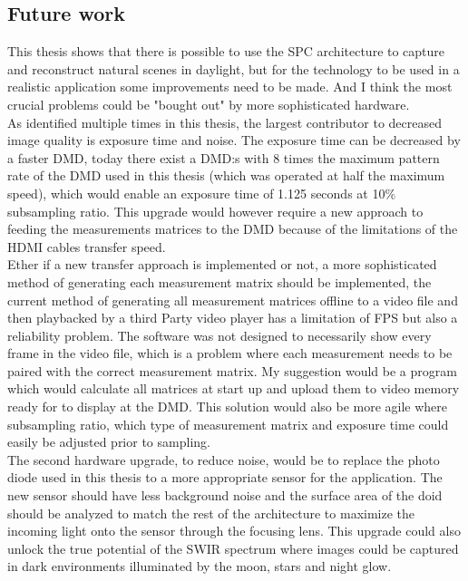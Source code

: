 \subsection{Future work}
This thesis shows that there is possible to use the SPC architecture to capture and reconstruct natural scenes in daylight, but for the technology to be used in a realistic application some improvements need to be made. And I think the most crucial problems could be "bought out" by more sophisticated hardware.\\[0.1in]

As identified multiple times in this thesis, the largest contributor to decreased image quality is exposure time and noise. The exposure time can be decreased by a faster DMD, today there exist a DMD:s with 8 times the maximum pattern rate of the DMD used in this thesis (which was operated at half the maximum speed), which would enable an exposure time of 1.125 seconds at 10\% subsampling ratio. This upgrade would however require a new approach to feeding the measurements matrices to the DMD because of the limitations of the HDMI cables transfer speed.\\[0.1in]

Ether if a new transfer approach is implemented or not, a more sophisticated method of generating each measurement matrix should be implemented, the current method of generating all  measurement matrices offline to a video file and then playbacked by a third Party video player has a limitation of FPS but also a reliability problem. The software was not designed to necessarily show every frame in the video file, which is a problem where each measurement needs to be paired with the correct measurement matrix. My suggestion would be a program which would calculate all matrices at start up and upload them to video memory ready for to display at the DMD. This solution would also be more agile where subsampling ratio, which type of measurement matrix and exposure time could easily be adjusted prior to sampling.\\[0.1in]

The second hardware upgrade, to reduce noise, would be to replace the photo diode used in this thesis to a more appropriate sensor for the application. The new sensor should have less background noise and the surface area of the doid should be analyzed to match the rest of the architecture to maximize the incoming light onto the sensor through the focusing lens. This upgrade could also unlock the true potential of the SWIR spectrum where images could be captured in dark environments illuminated by the moon, stars and night glow.\\[0.1in]

